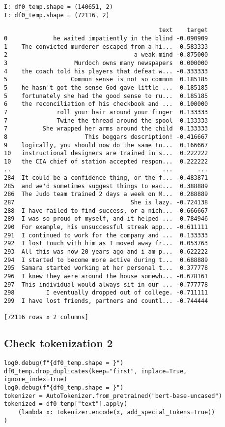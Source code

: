 \documentclass[a4paper,10pt,onecolumn,oneside,openright]{article}
\begin{document}
\begin{verbatim}
I: df0_temp.shape = (140651, 2)
I: df0_temp.shape = (72116, 2)
\end{verbatim}
\begin{verbatim}
                                            text    target
0             he waited impatiently in the blind -0.090909
1    The convicted murderer escaped from a hi...  0.583333
2                                    a weak mind -0.875000
3                   Murdoch owns many newspapers  0.000000
4    the coach told his players that defeat w... -0.333333
5                  Common sense is not so common  0.185185
5    he hasn't got the sense God gave little ...  0.185185
5    fortunately she had the good sense to ru...  0.185185
6    the reconciliation of his checkbook and ...  0.100000
7              roll your hair around your finger  0.133333
7              Twine the thread around the spool  0.133333
7          She wrapped her arms around the child  0.133333
8                      This beggars description! -0.416667
9    logically, you should now do the same to...  0.166667
10   instructional designers are trained in s...  0.222222
10   the CIA chief of station accepted respon...  0.222222
..                                           ...       ...
284  It could be a confidence thing, or the f... -0.483871
285  and we'd sometimes suggest things to eac...  0.388889
286  The Judo team trained 2 days a week on M...  0.288889
287                                 She is lazy. -0.724138
288  I have failed to find success, or a nich... -0.666667
289  I was so proud of myself, and it helped ...  0.784946
290  For example, his unsuccessful streak app... -0.611111
291  I continued to work for the company and ...  0.133333
292  I lost touch with him as I moved away fr...  0.053763
293  All this was now 20 years ago and i am p...  0.622222
294  I started to become more active during t...  0.688889
295  Samara started working at her personal t...  0.377778
296  I knew they were around the house somewh... -0.678161
297  This individual would always sit in our ... -0.777778
298         I eventually dropped out of college. -0.711111
299  I have lost friends, partners and countl... -0.744444

[72116 rows x 2 columns]
\end{verbatim}
\subsection{Check tokenization 2}
\label{sec:orgc1df96c}
\begin{verbatim}
log0.debug(f"{df0_temp.shape = }")
df0_temp.drop_duplicates(keep="first", inplace=True, ignore_index=True)
log0.debug(f"{df0_temp.shape = }")
tokenizer = AutoTokenizer.from_pretrained("bert-base-uncased")
tokenized = df0_temp["text"].apply(
    (lambda x: tokenizer.encode(x, add_special_tokens=True))
)
\end{verbatim}
\end{document}
